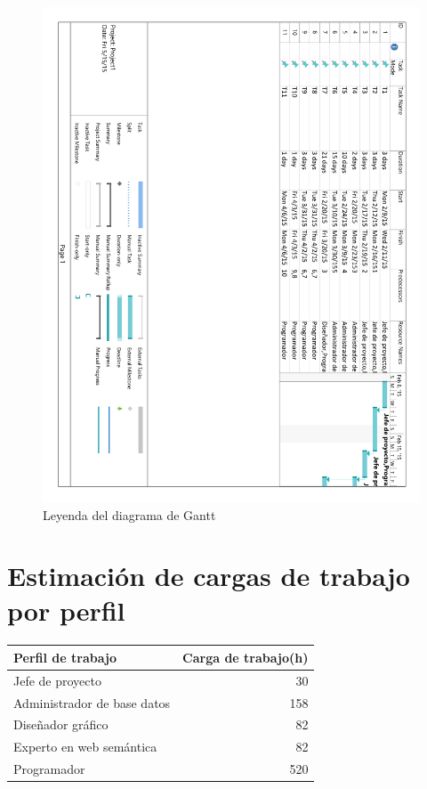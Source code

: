 \begin{figure}[!htp]
	\centering
	\includegraphics[page=3, scale=.7]{fig/gantt_diagram}
	\caption{Leyenda del diagrama de Gantt}
\end{figure}

\FloatBarrier

\section{Estimación de cargas de trabajo por perfil}

\begin{center}
	\begin{tabular}{|l|r|}
		\hline
		Perfil de trabajo & Carga de trabajo(h) \\ \hline
		Jefe de proyecto & 30 \\ \hline
		Administrador de base datos & 158 \\ \hline
		Diseñador gráfico & 82 \\ \hline
		Experto en web semántica & 82 \\ \hline
		Programador & 520 \\
		\hline
	\end{tabular}
\end{center}

